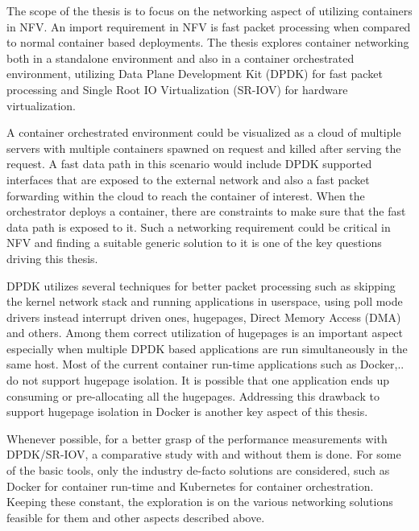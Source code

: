 \documentclass[english, 12pt, a4paper, elec, utf8, a-1b, online]{aaltothesis}
\begin{document}
The scope of the thesis is to focus on the networking aspect of utilizing containers in NFV. An import requirement in NFV is fast packet processing when compared to normal container based deployments. The thesis explores container networking both in a standalone environment and also in a container orchestrated environment, utilizing Data Plane Development Kit (DPDK) for fast packet processing and Single Root IO Virtualization (SR-IOV) for hardware virtualization.

A container orchestrated environment could be visualized as a cloud of multiple servers with multiple containers spawned on request and killed after serving the request. A fast data path in this scenario would include DPDK supported interfaces that are exposed to the external network and also a fast packet forwarding within the cloud to reach the container of interest. When the orchestrator deploys a container, there are constraints to make sure that the fast data path is exposed to it. Such a networking requirement could be critical in NFV and finding a suitable generic solution to it is one of the key questions driving this thesis.

DPDK utilizes several techniques for better packet processing such as skipping the kernel network stack and running applications in userspace, using poll mode drivers instead interrupt driven ones, hugepages, Direct Memory Access (DMA) and others. Among them correct utilization of hugepages is an important aspect especially when multiple DPDK based applications are run simultaneously in the same host. Most of the current container run-time applications such as Docker,.. do not support hugepage isolation. It is possible that one application ends up consuming or pre-allocating all the hugepages. Addressing this drawback to support hugepage isolation in Docker is another key aspect of this thesis.

Whenever possible, for a better grasp of the performance measurements with DPDK/SR-IOV, a comparative study with and without them is done. For some of the basic tools, only the industry de-facto solutions are considered, such as  Docker for container run-time and Kubernetes for container orchestration. Keeping these constant, the exploration is on the various networking solutions feasible for them and other aspects described above.



	
\end{document}
